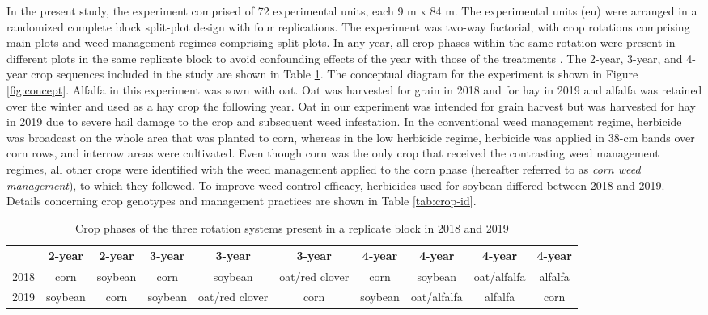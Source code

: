 \documentclass[
]{article}
\begin{document}
In the present study, the experiment comprised of 72 experimental units, each 9 m x 84 m. The experimental units (eu) were arranged in a randomized complete block split-plot design with four replications. The experiment was two-way factorial, with crop rotations comprising main plots and weed management regimes comprising split plots. In any year, all crop phases within the same rotation were present in different plots in the same replicate block to avoid confounding effects of the year with those of the treatments \citep{payneDesignAnalysisLong2015}. The 2-year, 3-year, and 4-year crop sequences included in the study are shown in Table \ref{tab:sequence}. The conceptual diagram for the experiment is shown in Figure \ref{fig:concept}. Alfalfa in this experiment was sown with oat. Oat was harvested for grain in 2018 and for hay in 2019 and alfalfa was retained over the winter and used as a hay crop the following year. Oat in our experiment was intended for grain harvest but was harvested for hay in 2019 due to severe hail damage to the crop and subsequent weed infestation. In the conventional weed management regime, herbicide was broadcast on the whole area that was planted to corn, whereas in the low herbicide regime, herbicide was applied in 38-cm bands over corn rows, and interrow areas were cultivated. Even though corn was the only crop that received the contrasting weed management regimes, all other crops were identified with the weed management applied to the corn phase (hereafter referred to as \emph{corn weed management}), to which they followed. To improve weed control efficacy, herbicides used for soybean differed between 2018 and 2019. Details concerning crop genotypes and management practices are shown in Table \ref{tab:crop-id}.

\begin{table}[H]

\caption{\label{tab:sequence}Crop phases of the three rotation systems present in a replicate block in 2018 and 2019}
\centering
\begin{tabular}[t]{l|c|c|c|c|c|c|c|c|c}
\hline
 & 2-year & 2-year & 3-year & 3-year & 3-year & 4-year & 4-year & 4-year & 4-year\\
\hline
2018 & corn & soybean & corn & soybean & oat/red clover & corn & soybean & oat/alfalfa & alfalfa\\
2019 & soybean & corn & soybean & oat/red clover & corn & soybean & oat/alfalfa & alfalfa & corn\\
\hline
\end{tabular}
\end{table}
\end{document}
